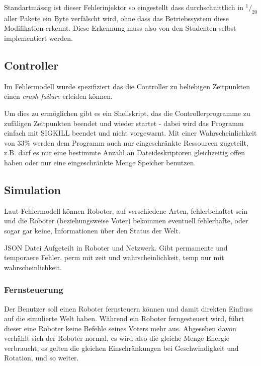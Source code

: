 
Standartm{\"{a}}ssig ist dieser Fehlerinjektor so eingestellt dass durchschnittlich in $ ^1/_{20} $ aller Pakete ein Byte verf{\"{a}}lscht wird,
ohne dass das Betriebssystem diese Modifikation erkennt. Diese Erkennung muss also von den Studenten selbst implementiert werden.

\subsection{Controller}
Im Fehlermodell wurde spezifiziert das die Controller zu beliebigen Zeitpunkten einen \textit{crash failure} erleiden k{\"{o}}nnen.

Um dies zu erm{\"{o}}glichen gibt es ein Shellskript, das die Controllerprogramme zu zuf{\"{a}}ligen Zeitpunkten beendet und wieder startet - dabei wird das Programm einfach mit SIGKILL beendet und nicht vorgewarnt.
Mit einer Wahrscheinlichkeit von 33\% werden dem Programm auch nur eingeschr{\"{a}}nkte Ressourcen zugeteilt, z.B. darf es nur eine bestimmte Anzahl an Dateideskriptoren gleichzeitig
offen haben oder nur eine eingeschr{\"{a}}nkte Menge Speicher benutzen.


\subsection{Simulation}
Laut Fehlermodell k{\"{o}}nnen Roboter, auf verschiedene Arten, fehlerbehaftet sein und die Roboter (beziehungsweise Voter) bekommen eventuell fehlerhafte, oder sogar gar keine, Informationen
{\"{u}}ber den Status der Welt.

JSON Datei
Aufgeteilt in Roboter und Netzwerk. Gibt permamente und temporaere Fehler. perm mit zeit und wahrscheinlichkeit, temp nur mit wahrscheinlichkeit.

\subsubsection{Fernsteuerung}
Der Benutzer soll einen Roboter fernsteuern k{\"{o}}nnen und damit direkten Einfluss auf die simulierte Welt haben. W{\"{a}}hrend ein Roboter
ferngesteuert wird, f{\"{u}}hrt dieser eine Roboter keine Befehle seines Voters mehr aus. Abgesehen davon verh{\"{a}}hlt sich der Roboter normal, es wird also die gleiche Menge Energie verbraucht,
es gelten die gleichen Einschr{\"{a}}nkungen bei Geschwindigkeit und Rotation, und so weiter.

